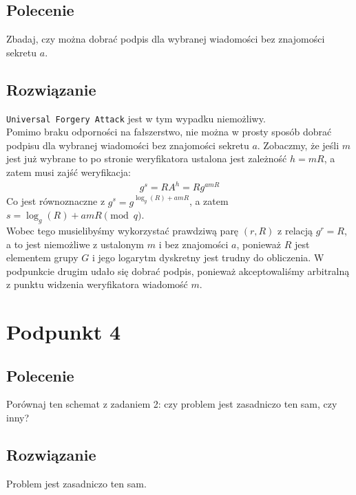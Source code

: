 \documentclass{article}
\numberwithin{equation}{subsection}
\begin{document}
\subsection{Polecenie}

Zbadaj, czy można dobrać podpis dla wybranej wiadomości bez znajomości sekretu $a$.

\subsection{Rozwiązanie}

\texttt{Universal Forgery Attack} jest w tym wypadku niemożliwy.\\

\noindent
Pomimo braku odporności na fałszerstwo, nie można w prosty sposób dobrać podpisu dla wybranej wiadomości bez znajomości sekretu $a$.
Zobaczmy, że jeśli $m$ jest już wybrane to po stronie weryfikatora ustalona jest zależność $h=mR$, a zatem musi zajść weryfikacja:
\begin{align*}
    g^s = RA^h = Rg^{amR}
\end{align*} 
Co jest równoznaczne z $g^s = g^{\log_g(R) + amR}$, a zatem $s = \log_g(R) + amR \pmod q$.\\

\noindent
Wobec tego musielibyśmy wykorzystać prawdziwą parę $(r,R)$ z relacją $g^r = R$, a to jest niemożliwe z ustalonym $m$ i
bez znajomości $a$, ponieważ $R$ jest elementem grupy $G$ i jego logarytm dyskretny jest trudny do obliczenia. W 
podpunkcie drugim udało się dobrać podpis, ponieważ akceptowaliśmy arbitralną z punktu widzenia weryfikatora
wiadomość $m$. 

\section{Podpunkt 4}

\subsection{Polecenie}

Porównaj ten schemat z zadaniem 2: czy problem jest zasadniczo ten sam, czy inny?

\subsection{Rozwiązanie}

Problem jest zasadniczo ten sam.\\
\end{document}

